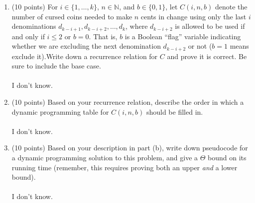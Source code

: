 \documentclass[12pt]{article}
\begin{document}
\begin{enumerate}
\begin{enumerate}
\item \label{3a} (10 points) For $i \in \{1,\dotsc,k\}$, $n \in \mathbb{N}$, and $b \in \{0,1\}$, let
    $C(i,n,b)$ denote the number of cursed coins needed to make $n$ cents in
    change using only the last $i$ denominations $d_{k-i+1}, d_{k-i+2}, \dotsc, d_k$,
    where $d_{k-i+2}$ is allowed to be used if and only if $i \leq 2$ or
    $b=0$. That is, $b$ is a Boolean ``flag'' variable indicating whether
    we are excluding the next denomination $d_{k-i+2}$ or not ($b=1$ means exclude
    it).Write down a recurrence relation for $C$ and prove it is
    correct. Be sure to include the base case.
\\ \\ I don't know.
\pagebreak
	
\item \label{3b} (10 points) Based on your recurrence relation, describe the order in
    which a dynamic programming table for $C(i,n,b)$ should be filled in.
\\ \\ I don't know.
\pagebreak
	
\item \label{3c} (10 points) Based on your description in part (b), write down pseudocode for a
    dynamic programming solution to this problem, and give a $\Theta$ bound on
    its running time (remember, this requires proving both an upper
    \emph{and} a lower bound).
\\ \\ I don't know.
\pagebreak
\end{enumerate}
	
	

\end{enumerate}
\end{document}
